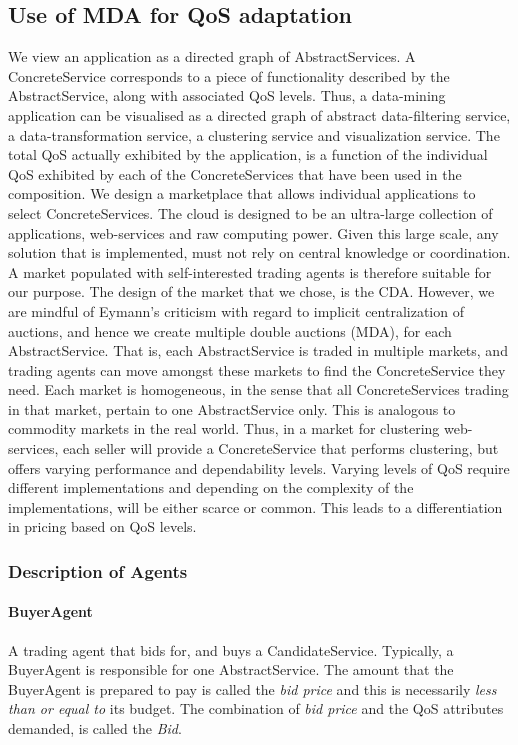 \documentclass[10pt,journal,compsoc]{IEEEtran}
\begin{document}
\subsection{Use of MDA for QoS adaptation}
We view an application as a directed graph of AbstractServices. A ConcreteService corresponds to a piece of functionality described by the AbstractService, along with associated QoS levels. Thus, a data-mining application can be visualised as a directed graph of abstract data-filtering service, a data-transformation service, a clustering service and visualization service. The total QoS actually exhibited by the application, is a function of the individual QoS exhibited by each of the ConcreteServices that have been used in the composition. We design a marketplace that allows individual applications to select ConcreteServices. The cloud is designed to be an ultra-large collection of applications, web-services and raw computing power. Given this large scale, any solution that is implemented, must not rely on central knowledge or coordination. A market populated with self-interested trading agents is therefore suitable for our purpose. The design of the market that we chose, is the CDA.  However, we are mindful of Eymann's criticism \cite{Eymann2003Decentralized} with regard to implicit centralization of auctions, and hence we create multiple double auctions (MDA), for each AbstractService. That is, each AbstractService is traded in multiple markets, and trading agents can move amongst these markets to find the ConcreteService they need. Each market is homogeneous, in the sense that all ConcreteServices trading in that market, pertain to one AbstractService only. This is analogous to commodity markets in the real world. Thus, in a market for clustering web-services, each seller will provide a ConcreteService that performs clustering, but offers varying performance and dependability levels. Varying levels of QoS require different implementations and depending on the complexity of the implementations, will be either scarce or common. This leads to a differentiation in pricing based on QoS levels.  

\subsubsection{Description of Agents}
\paragraph{BuyerAgent} A trading agent that bids for, and buys a CandidateService. Typically, a BuyerAgent is responsible for one AbstractService. The amount that the BuyerAgent is prepared to pay is called the \textsl{bid price} and this is necessarily \textit{less than or equal to} its budget. The combination of \textsl{bid price}  and the QoS attributes demanded, is called the \textsl{Bid}.
\end{document}
